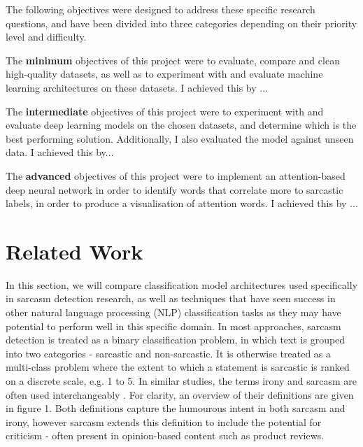 \documentclass[12pt,a4paper]{article}
\begin{document}
\noindent The following objectives were designed to address these specific research questions, and have been divided into three categories depending on their priority level and difficulty.

The \textbf{minimum} objectives of this project were to evaluate, compare and clean high-quality datasets, as well as to experiment with and evaluate machine learning architectures on these datasets. I achieved this by ...

The \textbf{intermediate} objectives of this project were to experiment with and evaluate deep learning models on the chosen datasets, and determine which is the best performing solution. Additionally, I also evaluated the model against unseen data. I achieved this by...

The \textbf{advanced} objectives of this project were to implement an attention-based deep neural network in order to identify words that correlate more to sarcastic labels, in order to produce a visualisation of attention words. I achieved this by ...





\vfill

\section{Related Work}
\noindent In this section, we will compare classification model architectures used specifically in sarcasm detection research, as well as techniques that have seen success in other natural language processing (NLP) classification tasks as they may have potential to perform well in this specific domain. In most approaches, sarcasm detection is treated as a binary classification problem, in which text is grouped into two categories - sarcastic and non-sarcastic. It is otherwise treated as a multi-class problem where the extent to which a statement is sarcastic is ranked on a discrete scale, e.g. 1 to 5. 
In similar studies, the terms irony and sarcasm are often used interchangeably \cite{tsur2010icwsm}. For clarity, an overview of their definitions are given in figure 1. Both definitions capture the humourous intent in both sarcasm and irony, however sarcasm extends this definition to include the potential for criticism - often present in opinion-based content such as product reviews.
\end{document}
